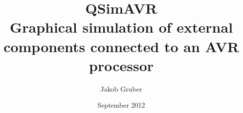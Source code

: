
\title{QSimAVR \\ Graphical simulation of external components connected to an AVR processor}
\author{Jakob Gruber}
\address{Kirschenallee 6/1, A-2120 Obersdorf}
\date{September 2012}


